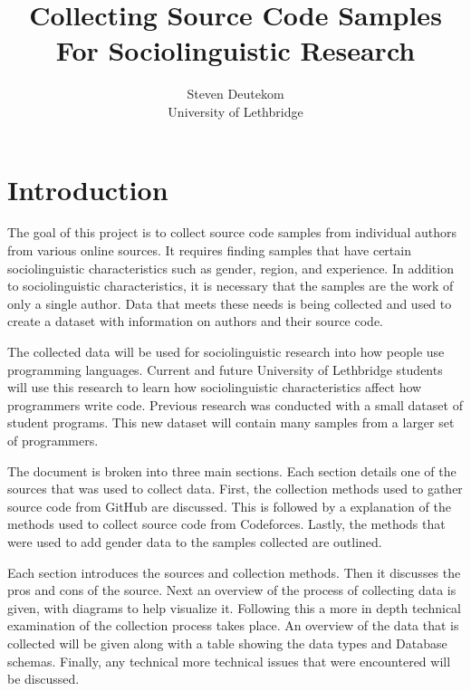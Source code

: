 \documentclass[12pt]{article}
\begin{document}
\begin{titlepage}
    \title{Collecting Source Code Samples For Sociolinguistic Research}
    \author{Steven Deutekom \\ University of Lethbridge}
    \maketitle
    \thispagestyle{empty}
\end{titlepage}



\newpage
\tableofcontents

\newpage
\listoffigures
\listoftables

\newpage
\doublespacing
{}
\section{Introduction}
The goal of this project is to collect source code samples from individual authors from various online sources. It requires finding samples that have certain sociolinguistic characteristics such as gender, region, and experience. In addition to sociolinguistic characteristics, it is necessary that the samples are the work of only a single author. Data that meets these needs is being collected and used to create a dataset with information on authors and their source code.

The collected data will be used for sociolinguistic research into how people use programming languages. Current and future University of Lethbridge students will use this research to learn how sociolinguistic characteristics affect how programmers write code. Previous research was conducted with a small dataset of student programs\cite{Naz2015}\cite{Rafee2017}. This new dataset will contain many samples from a larger set of programmers.

The document is broken into three main sections. Each section details one of the sources that was used to collect data. First, the collection methods used to gather source code from GitHub are discussed. This is followed by a explanation of the methods used to collect source code from Codeforces. Lastly, the methods that were used to add gender data to the samples collected are outlined.

Each section introduces the sources and collection methods. Then it discusses the pros and cons of the source. Next an overview of the process of collecting data is given, with diagrams to help visualize it. Following this a more in depth technical examination of the collection process takes place. An overview of the data that is collected will be given along with a table showing the data types and Database schemas. Finally, any technical more technical issues that were encountered will be discussed.
\end{document}
